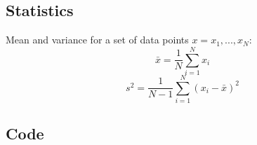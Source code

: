 \documentclass[preprint]{aastex62}
\begin{document}
\subsection{Statistics}
Mean and variance for a set of data points $x={x_1, ...,x_N}$:
\begin{equation}
	\bar{x} = \frac{1}{N} \sum^N_{i=1} x_i  
\end{equation}
\begin{equation}
	s^2 = \frac{1}{N-1} \sum^N_{i=1} (x_i - \bar{x})^2
\end{equation}

\subsection{Code}


\end{document}
